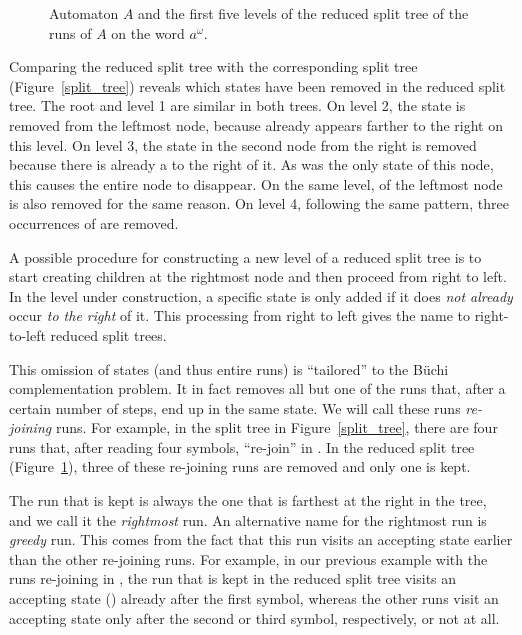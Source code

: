 \begin{figure}
\centering
\ReducedSplitTreeRightLeft
\caption{Automaton $A$ and the first five levels of the reduced split tree of the runs of $A$ on the word $a^\omega$.}
\label{reduced_split_tree}
\end{figure}

Comparing the reduced split tree with the corresponding split tree (Figure~\ref{split_tree}) reveals which states have been removed in the reduced split tree. The root and level 1 are similar in both trees. On level 2, the state  is removed from the leftmost node, because  already appears farther to the right on this level. On level 3, the state  in the second node from the right is removed because there is already a  to the right of it. As  was the only state of this node, this causes the entire node to disappear. On the same level,  of the leftmost node is also removed for the same reason. On level 4, following the same pattern, three occurrences of  are removed. 

A possible procedure for constructing a new level of a reduced split tree is to start creating children at the rightmost node and then proceed from right to left. In the level under construction, a specific state is only added if it does \textit{not already} occur \textit{to the right} of it. This processing from right to left gives the name to right-to-left reduced split trees.

This omission of states (and thus entire runs) is ``tailored'' to the Büchi complementation problem. It in fact removes all but one of the runs that, after a certain number of steps, end up in the same state. We will call these runs \textit{re-joining} runs. For example, in the split tree in Figure~\ref{split_tree}, there are four runs that, after reading four symbols, ``re-join'' in . In the reduced split tree (Figure~\ref{reduced_split_tree}), three of these re-joining runs are removed and only one is kept.

The run that is kept is always the one that is farthest at the right in the tree, and we call it the \textit{rightmost} run. An alternative name for the rightmost run is \textit{greedy} run. This comes from the fact that this run visits an accepting state earlier than the other re-joining runs. For example, in our previous example with the runs re-joining in , the run that is kept in the reduced split tree visits an accepting state () already after the first symbol, whereas the other runs visit an accepting state only after the second or third symbol, respectively, or not at all.

